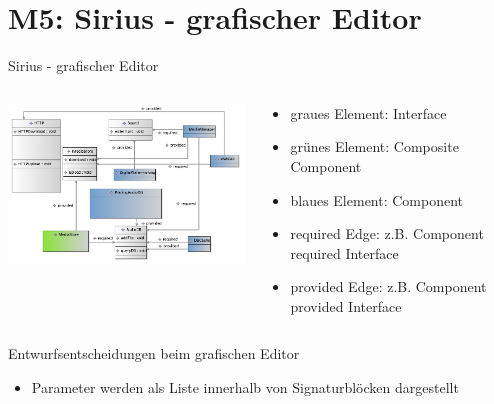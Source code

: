 \section[M5: Sirius]{M5: Sirius - grafischer Editor}
\begin{frame}{Sirius - grafischer Editor}
	\vspace{-5mm}
	\begin{columns}
		\begin{contentblock}{}
			\includegraphics[width=86mm]{figures/sirius.png}
		\end{contentblock}
		\begin{contentblock}{}
			\begin{itemize}
				\item graues Element: Interface
				\item grünes Element: Composite Component
				\item blaues Element: Component
				\item required Edge: z.B. Component required Interface 
				\item provided Edge: z.B. Component provided Interface
			\end{itemize}
		\end{contentblock}
	\end{columns}
\end{frame}

\begin{frame}{Entwurfsentscheidungen beim grafischen Editor}
	\begin{itemize}
		\item Parameter werden als Liste innerhalb von Signaturblöcken dargestellt
	\end{itemize}
\end{frame}